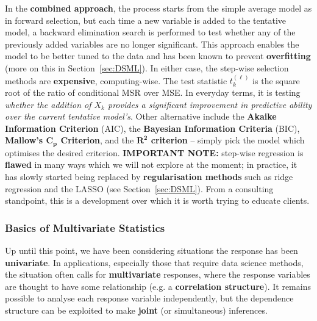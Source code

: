 \newpage\noindent
In the \textbf{combined approach}, the process starts from the simple average model as in forward selection, but each time a new variable is added to the tentative model, a backward elimination search is performed to test whether any of the previously added variables are no longer significant. This approach enables the model to be better tuned to the data and has been known to prevent \textbf{overfitting} (more on this in Section~\ref{sec:DSML}). In either case, the step-wise selection methods are \textbf{expensive}, computing-wise. 
\newl The test statistic $t^{(\ell)}_{k}$ is the square root of the ratio of conditional MSR over MSE. In everyday terms, it is testing \textit{whether the addition of $X_{k}$ provides a significant improvement in predictive ability over the current tentative model's}. Other alternative include the \textbf{Akaike Information Criterion} (AIC), the \textbf{Bayesian Information Criteria} (BIC), \textbf{Mallow's $\bm{C_{p}}$ Criterion}, and the \textbf{$\bm{R^2}$ criterion} -- simply pick the model which optimises the desired criterion. \newl \textbf{IMPORTANT NOTE:} step-wise regression is \textbf{flawed} in many ways which we will not explore at the moment; in practice, it has slowly started being replaced by \textbf{regularisation methods} such as ridge regression and the LASSO (see Section~\ref{sec:DSML}). From a consulting standpoint, this is a development over which it is worth trying to educate clients. 


\subsubsection{Basics of Multivariate Statistics}\label{sec: Multi.Stat}
Up until this point, we have been considering situations the response has been \textbf{univariate}. In applications, especially those that require data science methods, the situation often calls for \textbf{multivariate} responses,  where the response variables are thought to have some relationship (e.g. a \textbf{correlation structure}). It remains possible to analyse each response variable independently, but the dependence structure can be exploited to make \textbf{joint} (or simultaneous) inferences.

